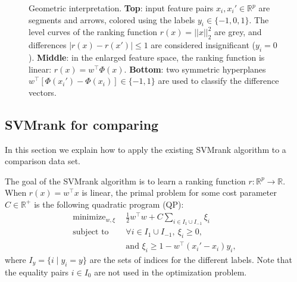 \documentclass{article}
\newcommand{\RR}{\mathbb R}
\DeclareMathOperator*{\minimize}{minimize}
\begin{document}


\begin{figure}
  \centering
  
  \vskip -0.5cm
  \caption{Geometric interpretation. \textbf{Top}: input feature pairs
    $x_i,x_i'\in\RR^p$ are segments and arrows, colored using the
    labels $y_i\in\{-1,0,1\}$. The level curves of the ranking
    function $r(x)=||x||_2^2$ are grey, and differences
    $|r(x)-r(x')|\leq 1$ are considered insignificant
    ($y_i=0$). \textbf{Middle}: in the enlarged feature space, the
    ranking function is linear: $r(x)=w^\intercal
    \Phi(x)$. \textbf{Bottom}: two symmetric hyperplanes
    $w^\intercal[\Phi(x_i')-\Phi(x_i)]\in\{-1,1\}$ are used to
    classify the difference vectors.}
  \label{fig:norm-data}
\end{figure}

\subsection{SVMrank for comparing}
\label{sec:svmrank}
In this section we explain how to apply the existing SVMrank algorithm
to a comparison data set.

The goal of the SVMrank algorithm is to learn a ranking function
$r:\RR^p \rightarrow \RR$. When $r(x)=w^\intercal x$ is linear, the
primal problem for some cost parameter $C\in\RR^+$ is the following
quadratic program (QP):
\begin{equation}
  \begin{aligned}
    \minimize_{w, \xi}\ \  & \frac 1 2 w^\intercal w 
    + C \sum_{i\in I_1\cup I_{-1}} \xi_i \\
    \text{subject to}\ \  & 
    \forall i\in I_1\cup I_{-1},\ \xi_i \geq 0,\\
&    \text{and }\xi_i \geq 1-w^\intercal(x_i'-x_i)y_i,
  \end{aligned}
  \label{eq:svmrank}
\end{equation}
where $I_y=\{i\mid y_i=y\}$ are the sets of indices for the different
labels. Note that the equality pairs $i\in I_0$ are not
used in the optimization problem.
\end{document}
